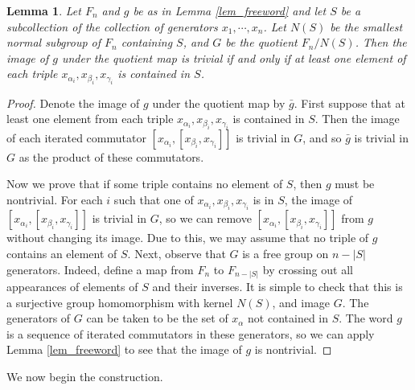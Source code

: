 \documentclass[12pt]{amsart}
\newtheorem{lemma}[thm]{Lemma}
\theoremstyle{definition}
\theoremstyle{remark}
\begin{document}
\begin{lemma}
Let $F_n$ and $g$ be as in Lemma \ref{lem_freeword} and let $S$ be a subcollection of the collection of generators $x_1, \cdots, x_n$.  Let $N(S)$ be the smallest normal subgroup of $F_n$ containing $S$, and $G$ be the quotient $F_n / N(S)$.  Then the image of $g$ under the quotient map is trivial if and only if at least one element of each triple $x_{\alpha_i},x_{\beta_i},x_{\gamma_i}$ is contained in $S$.
\label{lem_clauselinkage}
\end{lemma}
\begin{proof}
Denote the image of $g$ under the quotient map by $\bar g$. First suppose that at least one element from each triple $x_{\alpha_i},x_{\beta_i},x_{\gamma_i}$ is contained in $S$.  Then the image of each iterated commutator $[x_{\alpha_i}, [ x_{\beta_i}, x_{\gamma_i}]]$ is trivial in $G$, and so $\bar g$ is trivial in $G$ as the product of these commutators.

Now we prove that if some triple contains no element of $S$, then $g$ must be nontrivial.  For each $i$ such that one of $x_{\alpha_i},x_{\beta_i},x_{\gamma_i}$ is in $S$, the image of $[x_{\alpha_i}, [ x_{\beta_i}, x_{\gamma_i}]]$ is trivial in $G$, so we can remove $[x_{\alpha_i}, [ x_{\beta_i}, x_{\gamma_i}]]$  from $g$ without changing its image.  Due to this, we may assume that no triple of $g$ contains an element of $S$.  Next, observe that $G$ is a free group on $n - |S|$ generators.  Indeed, define a map from $F_n$ to $F_{n-|S|}$ by crossing out all appearances of elements of $S$ and their inverses. It is simple to check that this is a surjective group homomorphism with kernel $N(S)$, and image $G$. The generators of $G$ can be taken to be the set of $x_\alpha$ not contained in $S$. The word $g$ is a sequence of iterated commutators in these generators, so we can apply Lemma \ref{lem_freeword} to see that the image of $g$ is nontrivial.
\end{proof}

We now begin the construction.
\end{document}
